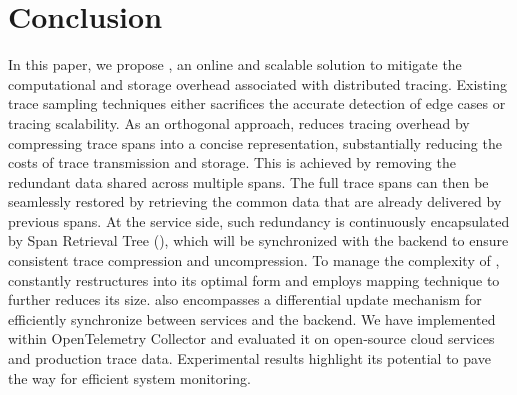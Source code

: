 \section{Conclusion}
\label{sec:conclusion}

In this paper, we propose \alias, an online and scalable solution to mitigate the computational and storage overhead associated with distributed tracing.
Existing trace sampling techniques either sacrifices the accurate detection of edge cases or tracing scalability.
As an orthogonal approach, \alias reduces tracing overhead by compressing trace spans into a concise representation, substantially reducing the costs of trace transmission and storage.
This is achieved by removing the redundant data shared across multiple spans.
The full trace spans can then be seamlessly restored by retrieving the common data that are already delivered by previous spans.
At the service side, such redundancy is continuously encapsulated by Span Retrieval Tree (\sname), which will be synchronized with the backend to ensure consistent trace compression and uncompression.
To manage the complexity of \sname, \alias constantly restructures \sname into its optimal form and employs mapping technique to further reduces its size.
\alias also encompasses a differential update mechanism for efficiently synchronize \sname between services and the backend.
We have implemented \alias within OpenTelemetry Collector and evaluated it on open-source cloud services and production trace data.
Experimental results highlight its potential to pave the way for efficient system monitoring.